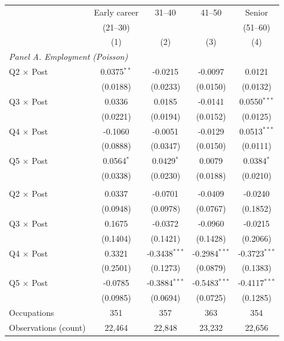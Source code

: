 \begin{tabular}{lcccc}
\toprule
 & Early career & 31--40 & 41--50 & Senior \\
 & (21--30) &  &  & (51--60) \\
 & (1) & (2) & (3) & (4) \\
\midrule
\multicolumn{5}{l}{\textit{Panel A. Employment (Poisson)}} \\
Q2 $\times$ Post & 0.0375$^{**}$ & -0.0215 & -0.0097 & 0.0121 \\
 & (0.0188) & (0.0233) & (0.0150) & (0.0132) \\
Q3 $\times$ Post & 0.0336 & 0.0185 & -0.0141 & 0.0550$^{***}$ \\
 & (0.0221) & (0.0194) & (0.0152) & (0.0125) \\
Q4 $\times$ Post & -0.1060 & -0.0051 & -0.0129 & 0.0513$^{***}$ \\
 & (0.0888) & (0.0347) & (0.0150) & (0.0111) \\
Q5 $\times$ Post & 0.0564$^{*}$ & 0.0429$^{*}$ & 0.0079 & 0.0384$^{*}$ \\
 & (0.0338) & (0.0230) & (0.0188) & (0.0210) \\
\addlinespace
\multicolumn{5}{l}{\textit{Panel B. New hires (Poisson)}} \\
Q2 $\times$ Post & 0.0337 & -0.0701 & -0.0409 & -0.0240 \\
 & (0.0948) & (0.0978) & (0.0767) & (0.1852) \\
Q3 $\times$ Post & 0.1675 & -0.0372 & -0.0960 & -0.0215 \\
 & (0.1404) & (0.1421) & (0.1428) & (0.2066) \\
Q4 $\times$ Post & 0.3321 & -0.3438$^{***}$ & -0.2984$^{***}$ & -0.3723$^{***}$ \\
 & (0.2501) & (0.1273) & (0.0879) & (0.1383) \\
Q5 $\times$ Post & -0.0785 & -0.3884$^{***}$ & -0.5483$^{***}$ & -0.4117$^{***}$ \\
 & (0.0985) & (0.0694) & (0.0725) & (0.1285) \\
\midrule
Occupations & 351 & 357 & 363 & 354 \\
Observations (count) & 22,464 & 22,848 & 23,232 & 22,656 \\
\bottomrule
\end{tabular}
